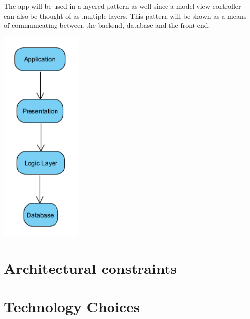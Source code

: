 \documentclass[hidelinks, 12pt, a4paper]{article}
\begin{document}
The app will be used in a layered pattern as well since a model view controller can also be thought of as multiple layers.
This pattern will be shown as a means of communicating between the backend, database and the front end.
\begin{center}
    \noindent
    \includegraphics[width=4cm]{images/layered.png}
    \vspace{0.5cm}
\end{center}
\newpage
\section{Architectural constraints}
\newpage
\section{Technology Choices}
\end{document}
